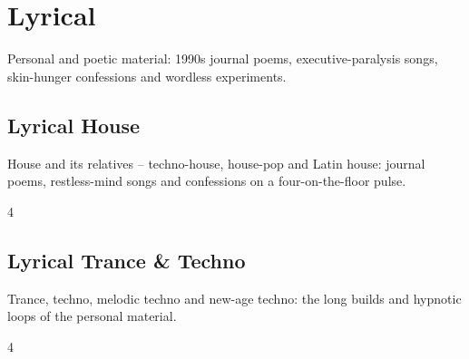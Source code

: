 \documentclass[a4paper,landscape]{memoir}
\begin{document}
\part{Lyrical}
Personal and poetic material: 1990s journal poems, executive-paralysis songs, skin-hunger confessions and wordless experiments.

\chapter{Lyrical House}
House and its relatives -- techno-house, house-pop and Latin house: journal poems, restless-mind songs and confessions on a four-on-the-floor pulse.
\clearpage\begin{multicols*}{4}
\end{multicols*}

\chapter{Lyrical Trance \& Techno}
Trance, techno, melodic techno and new-age techno: the long builds and hypnotic loops of the personal material.
\clearpage\begin{multicols*}{4}
\end{multicols*}
\end{document}
